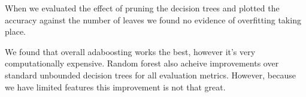 \documentclass[letterpaper,12pt]{article}
\begin{document}
When we evaluated the effect of pruning the decision trees and plotted the accuracy against the number of leaves we found no evidence of overfitting taking place.

We found that overall adaboosting works the best, however it's very computationally expensive. Random forest also acheive improvements over standard unbounded decision trees for all evaluation metrics. However, because we have limited features this improvement is not that great.

%
\end{document}
